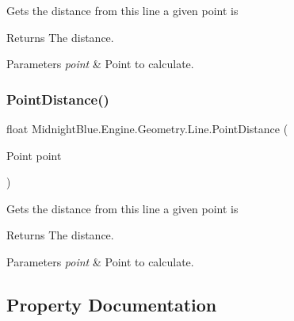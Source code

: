 Gets the distance from this line a given point is 

\begin{DoxyReturn}{Returns}
The distance.
\end{DoxyReturn}

\begin{DoxyParams}{Parameters}
{\em point} & Point to calculate.\\
\hline
\end{DoxyParams}
\hypertarget{class_midnight_blue_1_1_engine_1_1_geometry_1_1_line_a6db10326db04557bde223029167254a8}{}\label{class_midnight_blue_1_1_engine_1_1_geometry_1_1_line_a6db10326db04557bde223029167254a8} 
\subsubsection{\texorpdfstring{Point\+Distance()}{PointDistance()}\hspace{0.1cm}{\footnotesize\ttfamily [2/2]}}
{\footnotesize\ttfamily float Midnight\+Blue.\+Engine.\+Geometry.\+Line.\+Point\+Distance (\begin{DoxyParamCaption}\item[{Point}]{point }\end{DoxyParamCaption})\hspace{0.3cm}{\ttfamily [inline]}}



Gets the distance from this line a given point is 

\begin{DoxyReturn}{Returns}
The distance.
\end{DoxyReturn}

\begin{DoxyParams}{Parameters}
{\em point} & Point to calculate.\\
\hline
\end{DoxyParams}


\subsection{Property Documentation}
\hypertarget{class_midnight_blue_1_1_engine_1_1_geometry_1_1_line_ad825e12a4c0889bd9a6999b473b3e317}{}\label{class_midnight_blue_1_1_engine_1_1_geometry_1_1_line_ad825e12a4c0889bd9a6999b473b3e317} 
